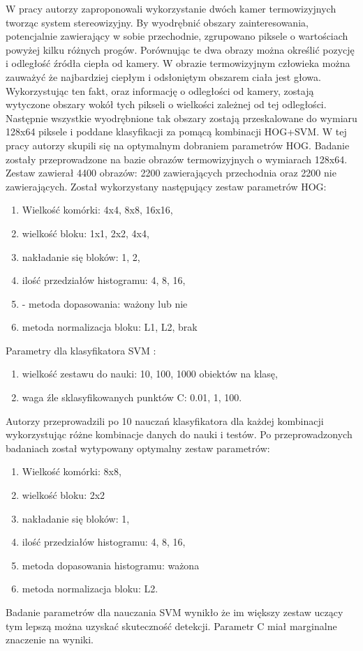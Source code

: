 W pracy \cite{suard2006pedestrian} autorzy zaproponowali wykorzystanie dwóch kamer termowizyjnych tworząc system stereowizyjny. By wyodrębnić obszary zainteresowania, potencjalnie zawierający w sobie przechodnie, zgrupowano piksele o wartościach powyżej kilku różnych progów. Porównując te dwa obrazy można określić pozycję i odległość źródła ciepła od kamery. W obrazie termowizyjnym człowieka można zauważyć że najbardziej ciepłym i odsłoniętym obszarem ciała jest głowa. Wykorzystując ten fakt, oraz informację o odległości od kamery, zostają wytyczone obszary wokół tych pikseli o wielkości zależnej od tej odległości. Następnie wszystkie wyodrębnione tak obszary zostają przeskalowane do wymiaru 128x64 piksele i poddane klasyfikacji za pomącą kombinacji HOG+SVM. 
W tej pracy autorzy skupili się na optymalnym dobraniem parametrów HOG. Badanie zostały przeprowadzone na bazie obrazów termowizyjnych o wymiarach 128x64. Zestaw zawierał 4400 obrazów: 2200 zawierających przechodnia oraz 2200 nie zawierających. Został wykorzystany następujący zestaw parametrów HOG:
\begin{enumerate}

\item Wielkość komórki:  4x4, 8x8, 16x16,
\item wielkość bloku: 1x1, 2x2, 4x4,
\item nakładanie się bloków: 1, 2,
\item ilość przedziałów histogramu: 4, 8, 16,
\item- metoda dopasowania: ważony lub nie
\item metoda normalizacja bloku: L1, L2, brak
\end{enumerate}
Parametry dla klasyfikatora SVM :
\begin{enumerate}
\item wielkość zestawu do nauki: 10, 100, 1000 obiektów na klasę,
\item waga źle sklasyfikowanych punktów C: 0.01, 1, 100.
\end{enumerate}
Autorzy przeprowadzili po 10 nauczań klasyfikatora dla każdej kombinacji wykorzystując różne kombinacje danych do nauki i testów. Po przeprowadzonych badaniach został wytypowany optymalny zestaw parametrów:
\begin{enumerate}
\item Wielkość komórki: 8x8, 
\item wielkość bloku: 2x2
\item nakładanie się bloków: 1,
\item ilość przedziałów histogramu: 4, 8, 16,
\item metoda dopasowania histogramu: ważona 
\item metoda normalizacja bloku: L2.
\end{enumerate}
Badanie parametrów dla nauczania SVM wynikło że im większy zestaw uczący tym lepszą można uzyskać skuteczność detekcji. Parametr C miał marginalne znaczenie na wyniki.


